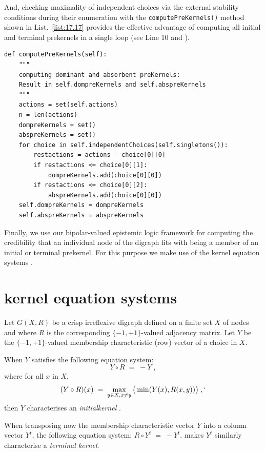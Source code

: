 And, checking maximality of independent choices via the external stability conditions during their enumeration with the \texttt{computePreKernels()} method shown in List.~\vref{list:17.17} provides the effective advantage of computing all initial and terminal prekernels in a single loop (see Line 10 and \citep{BIS-2006b}).
\begin{lstlisting}[caption={Computing dominant and absorbent preKernels},label=list:17.17]
def computePreKernels(self):
    """
    computing dominant and absorbent preKernels:
    Result in self.dompreKernels and self.abspreKernels
    """
    actions = set(self.actions)
    n = len(actions)
    dompreKernels = set()
    abspreKernels = set()
    for choice in self.independentChoices(self.singletons()):
        restactions = actions - choice[0][0]
        if restactions <= choice[0][1]:
            dompreKernels.add(choice[0][0])
        if restactions <= choice[0][2]:
            abspreKernels.add(choice[0][0])
    self.dompreKernels = dompreKernels
    self.abspreKernels = abspreKernels
\end{lstlisting}
 
Finally, we use our bipolar-valued epistemic logic framework for computing the credibility that an individual node of the digraph fits with being a member of an initial or terminal prekernel. For this purpose we make use of the \Berge kernel equation systems \citep{BER-1958}.

\section{\Berge kernel equation systems}
\label{sec:17.6}

Let $G(X,R)$ be a crisp irreflexive digraph defined on a finite set $X$ of nodes and where $R$ is the corresponding $\{-1,+1\}$-valued adjacency matrix. Let $Y$ be the $\{-1,+1\}$-valued membership characteristic (row) vector of a choice in $X$.

When $Y$ satisfies the following equation system:
\begin{equation}
  Y \circ R \; = \; -Y\;,
\end{equation}
where for all $x$ in $X$,
\begin{equation}\label{eq:17.2}
     (Y \circ R)(x) \; = \; \max_{y \in X, x \neq y} \big ( \min(Y(x), R(x,y))\big)\;,`
\end{equation}
then $Y$ characterises an \emph{initialkernel} \citep{BER-1958}.

When transposing now the membership characteristic vector $Y$ into a column vector $Y^t$, the following equation system: $R \circ Y^t \; = \; -Y^t$.
makes $Y^t$ similarly characterise a \emph{terminal kernel}.

